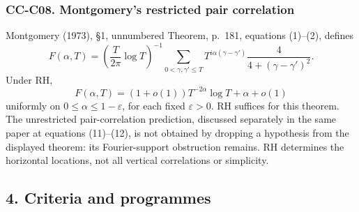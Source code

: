 \subsubsection{CC-C08. Montgomery's restricted pair
correlation}\label{cc-c08.-montgomerys-restricted-pair-correlation}

Montgomery (1973), §1, unnumbered Theorem, p.~181, equations (1)--(2),
defines \[
 F(\alpha,T)=\left(\frac{T}{2\pi}\log T\right)^{-1}
 \sum_{0<\gamma,\gamma'\le T}
 T^{i\alpha(\gamma-\gamma')}
 \frac4{4+(\gamma-\gamma')^2}.
\] Under RH, \[
 F(\alpha,T)=(1+o(1))T^{-2\alpha}\log T+\alpha+o(1)
\] uniformly on \(0\le\alpha\le1-\varepsilon\), for each fixed
\(\varepsilon>0\). RH suffices for this theorem. The unrestricted
pair-correlation prediction, discussed separately in the same paper at
equations (11)--(12), is not obtained by dropping a hypothesis from the
displayed theorem: its Fourier-support obstruction remains. RH
determines the horizontal locations, not all vertical correlations or
simplicity.

\subsection{4. Criteria and programmes}\label{criteria-and-programmes}


